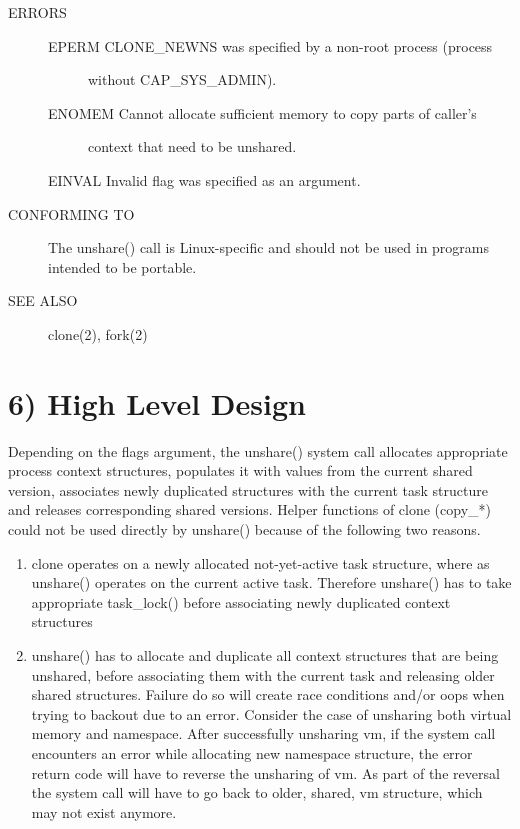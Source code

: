 \documentclass[a4paper,8pt,english]{sphinxmanual}
\begin{document}
\begin{description}
\item[{ERRORS}] \leavevmode\begin{description}
\item[{EPERM   CLONE\_NEWNS was specified by a non-root process (process}] \leavevmode
without CAP\_SYS\_ADMIN).

\item[{ENOMEM  Cannot allocate sufficient memory to copy parts of caller's}] \leavevmode
context that need to be unshared.

\end{description}

EINVAL  Invalid flag was specified as an argument.

\item[{CONFORMING TO}] \leavevmode
The unshare() call is Linux-specific and  should  not be used
in programs intended to be portable.

\item[{SEE ALSO}] \leavevmode
clone(2), fork(2)

\end{description}


\section{6) High Level Design}
\label{userspace-api/unshare:high-level-design}
Depending on the flags argument, the unshare() system call allocates
appropriate process context structures, populates it with values from
the current shared version, associates newly duplicated structures
with the current task structure and releases corresponding shared
versions. Helper functions of clone (copy\_*) could not be used
directly by unshare() because of the following two reasons.
\begin{enumerate}
\item {} 
clone operates on a newly allocated not-yet-active task
structure, where as unshare() operates on the current active
task. Therefore unshare() has to take appropriate task\_lock()
before associating newly duplicated context structures

\item {} 
unshare() has to allocate and duplicate all context structures
that are being unshared, before associating them with the
current task and releasing older shared structures. Failure
do so will create race conditions and/or oops when trying
to backout due to an error. Consider the case of unsharing
both virtual memory and namespace. After successfully unsharing
vm, if the system call encounters an error while allocating
new namespace structure, the error return code will have to
reverse the unsharing of vm. As part of the reversal the
system call will have to go back to older, shared, vm
structure, which may not exist anymore.

\end{enumerate}
\end{document}
